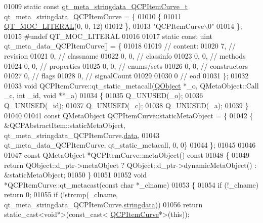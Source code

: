 \begin{DoxyCode}
01009 \textcolor{keyword}{static} \textcolor{keyword}{const} \hyperlink{a00067_d8/d72/a00199}{qt\_meta\_stringdata\_QCPItemCurve\_t} 
      qt\_meta\_stringdata\_QCPItemCurve = \{
01010     \{
01011 \hyperlink{a00067_a75bb9482d242cde0a06c9dbdc6b83abe}{QT\_MOC\_LITERAL}(0, 0, 12)
01012     \},
01013     \textcolor{stringliteral}{"QCPItemCurve\(\backslash\)0"}
01014 \};
01015 \textcolor{preprocessor}{#undef QT\_MOC\_LITERAL}
01016 
01017 \textcolor{keyword}{static} \textcolor{keyword}{const} uint qt\_meta\_data\_QCPItemCurve[] = \{
01018 
01019  \textcolor{comment}{// content:}
01020        7,       \textcolor{comment}{// revision}
01021        0,       \textcolor{comment}{// classname}
01022        0,    0, \textcolor{comment}{// classinfo}
01023        0,    0, \textcolor{comment}{// methods}
01024        0,    0, \textcolor{comment}{// properties}
01025        0,    0, \textcolor{comment}{// enums/sets}
01026        0,    0, \textcolor{comment}{// constructors}
01027        0,       \textcolor{comment}{// flags}
01028        0,       \textcolor{comment}{// signalCount}
01029 
01030        0        \textcolor{comment}{// eod}
01031 \};
01032 
01033 \textcolor{keywordtype}{void} QCPItemCurve::qt\_static\_metacall(\hyperlink{a00059}{QObject} *\_o, QMetaObject::Call \_c, \textcolor{keywordtype}{int} \_id, \textcolor{keywordtype}{void} **\_a)
01034 \{
01035     Q\_UNUSED(\_o);
01036     Q\_UNUSED(\_id);
01037     Q\_UNUSED(\_c);
01038     Q\_UNUSED(\_a);
01039 \}
01040 
01041 \textcolor{keyword}{const} QMetaObject QCPItemCurve::staticMetaObject = \{
01042     \{ &QCPAbstractItem::staticMetaObject, qt\_meta\_stringdata\_QCPItemCurve.\hyperlink{a00067_a0424f9a0b87bc8cefa2966874c4c5667}{data},
01043       qt\_meta\_data\_QCPItemCurve,  qt\_static\_metacall, 0, 0\}
01044 \};
01045 
01046 
01047 \textcolor{keyword}{const} QMetaObject *QCPItemCurve::metaObject()\textcolor{keyword}{ const}
01048 \textcolor{keyword}{}\{
01049     \textcolor{keywordflow}{return} QObject::d\_ptr->metaObject ? QObject::d\_ptr->dynamicMetaObject() : &staticMetaObject;
01050 \}
01051 
01052 \textcolor{keywordtype}{void} *QCPItemCurve::qt\_metacast(\textcolor{keyword}{const} \textcolor{keywordtype}{char} *\_clname)
01053 \{
01054     \textcolor{keywordflow}{if} (!\_clname) \textcolor{keywordflow}{return} 0;
01055     \textcolor{keywordflow}{if} (!strcmp(\_clname, qt\_meta\_stringdata\_QCPItemCurve.\hyperlink{a00067_af1db92bb182f435f88c938cc13a52a2c}{stringdata}))
01056         \textcolor{keywordflow}{return} \textcolor{keyword}{static\_cast<}\textcolor{keywordtype}{void}*\textcolor{keyword}{>}(\textcolor{keyword}{const\_cast<} \hyperlink{a00034}{QCPItemCurve}*\textcolor{keyword}{>}(\textcolor{keyword}{this}));

\end{DoxyCode}
